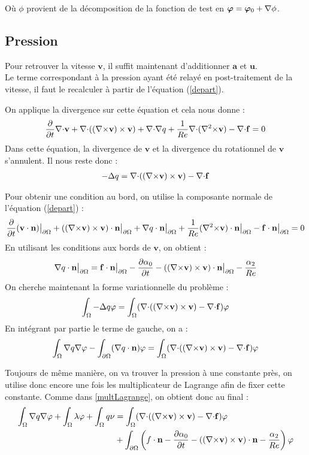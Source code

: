 Où $\phi$ provient de la décomposition de la fonction de test en $\bm{\varphi}=\bm{\varphi}_0+{\nabla}\phi$.

\subsection{Pression}
\label{pression}

Pour retrouver la vitesse $\mathbf{v}$, il suffit maintenant d'additionner $\mathbf{a}$ et $\mathbf{u}$.\\
Le terme correspondant à la pression ayant été relayé en post-traitement de la vitesse, il faut le recalculer à partir de l'équation (\ref{depart}).

On applique la divergence sur cette équation et cela nous donne :
\[ \frac{\partial}{\partial t}{\nabla\cdot} \mathbf{v} + {\nabla\cdot}(({\nabla\times} \mathbf{v})\times \mathbf{v}) + {\nabla\cdot}{\nabla} q + \frac{1}{Re}{\nabla\cdot}({\nabla^2\times} \mathbf{v}) - {\nabla\cdot} \mathbf{f} = 0 \]
Dans cette équation, la divergence de $\mathbf{v}$ et la divergence du rotationnel de $\mathbf{v}$ s'annulent. Il nous reste donc :
\begin{eqnarray}\label{q}
-{\Delta} q = {\nabla\cdot}(({\nabla\times} \mathbf{v})\times \mathbf{v}) - {\nabla\cdot} \mathbf{f}
\end{eqnarray}

Pour obtenir une condition au bord, on utilise la composante normale de l'équation (\ref{depart}) :
\[ \frac{\partial}{\partial t}(\mathbf{v}\cdot \mathbf{n}){\big\rvert_{\partial\Omega}} + (({\nabla\times} \mathbf{v})\times \mathbf{v})\cdot \mathbf{n}{\big\rvert_{\partial\Omega}} + {\nabla} q\cdot \mathbf{n}{\big\rvert_{\partial\Omega}} +\frac{1}{Re}({\nabla^2\times} \mathbf{v})\cdot \mathbf{n}{\big\rvert_{\partial\Omega}} - \mathbf{f}\cdot \mathbf{n}{\big\rvert_{\partial\Omega}} = 0 \]
En utilisant les conditions aux bords de $\mathbf{v}$, on obtient :
\[ {\nabla} q\cdot \mathbf{n}{\big\rvert_{\partial\Omega}} =  \mathbf{f}\cdot \mathbf{n}{\big\rvert_{\partial\Omega}} - \frac{\partial\alpha_0}{\partial t} - (({\nabla\times} \mathbf{v})\times \mathbf{v})\cdot \mathbf{n}{\big\rvert_{\partial\Omega}} - \frac{\alpha_2}{Re} \]
On cherche maintenant la forme variationnelle du problème :
\[ \int_\Omega -{\Delta} q\varphi = \int_\Omega ({\nabla\cdot}(({\nabla\times} \mathbf{v})\times \mathbf{v}) -{\nabla\cdot} \mathbf{f})\varphi \]
En intégrant par partie le terme de gauche, on a :
\[ \int_\Omega {\nabla} q{\nabla}\varphi - \int_{\partial\Omega} ({\nabla} q\cdot \mathbf{n})\varphi = \int_\Omega ({\nabla\cdot}(({\nabla\times} \mathbf{v})\times \mathbf{v}) -{\nabla\cdot} \mathbf{f})\varphi \]

Toujours de même manière, on va trouver la pression à une constante près, on utilise donc encore une fois les multiplicateur de Lagrange afin de fixer cette constante. Comme dans \ref{multLagrange}, on obtient donc au final :
\begin{equation}\label{fvq}
\begin{aligned}
\int_\Omega {\nabla} q{\nabla}\varphi + \int_\Omega \lambda\varphi + \int_\Omega q\nu &= \int_\Omega ({\nabla\cdot}(({\nabla\times} \mathbf{v})\times \mathbf{v}) -{\nabla\cdot} \mathbf{f})\varphi\\
&+ \int_{\partial\Omega} \left(f\cdot \mathbf{n} - \frac{\partial\alpha_0}{\partial t} - (({\nabla\times} \mathbf{v})\times \mathbf{v})\cdot \mathbf{n} - \frac{\alpha_2}{Re}\right)\varphi
\end{aligned}
\end{equation}

